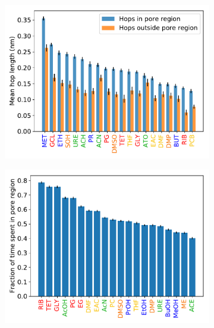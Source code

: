 \documentclass{article}
\begin{document}
  \begin{figure}
  \centering
  \begin{subfigure}{0.325\textwidth}
  \includegraphics[width=\linewidth]{hop_length.pdf}
  \caption{}\label{fig:hop_lengths}
  \end{subfigure}
  \begin{subfigure}{0.325\textwidth}
  \includegraphics[width=\textwidth]{frac_time_spent.pdf}
  \caption{}\label{fig:frac_time}
  \end{subfigure}
  \begin{subfigure}{0.325\textwidth}

\end{subfigure}
\end{figure}
\end{document}
